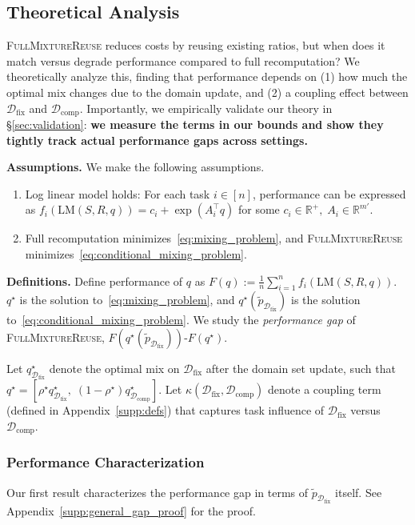 \documentclass[table]{ai2style/ai2}
\newcommand{\R}[0]{\mathbb{R}}
\newcommand{\LM}[0]{\text{LM}}
\newcommand{\Dfix}[0]{\mathcal{D}_{\text{fix}}}
\newcommand{\Dcomp}[0]{\mathcal{D}_{\text{comp}}}
\newcommand{\fullmixreuse}[0]{\textsc{FullMixtureReuse}\xspace}
\begin{document}
\subsection{Theoretical Analysis}\label{sec:analysis}

\fullmixreuse reduces costs by reusing existing ratios, but when does it match versus degrade performance compared to full recomputation? We theoretically analyze this, finding that performance depends on (1) how much the optimal mix changes due to the domain update, and (2) a coupling effect between $\Dfix$ and $\Dcomp$.
Importantly, we empirically validate our theory in \S\ref{sec:validation}: \textbf{we measure the terms in our bounds and show they tightly track actual performance gaps across settings.}

\textbf{Assumptions.} We make the following assumptions.
\begin{enumerate}[itemsep=0pt,topsep=2pt,leftmargin=12pt]
    \item Log linear model holds: For each task $i\in[n]$, performance can be expressed as $f_i(\LM(S,R,q)) = c_i + \exp(A_i^\top q)$ for some $c_i\in\R^+,\; A_i\in\R^{m'}$.
    \item Full recomputation minimizes~\eqref{eq:mixing_problem}, and \fullmixreuse minimizes~\eqref{eq:conditional_mixing_problem}. 
\end{enumerate}

\textbf{Definitions.}
Define performance of $q$ as $F(q) := \frac{1}{n}\sum_{i=1}^n f_i(\LM(S,R,q))$. $q^\star$ is the solution to~\eqref{eq:mixing_problem}, and $q^\star(\tilde p_{\Dfix})$ is the solution to~\eqref{eq:conditional_mixing_problem}. We study the \emph{performance gap} of \fullmixreuse, $F(q^\star(\tilde p_{\Dfix})) \texttt{-} F(q^\star)$.

Let $q^\star_{\Dfix}$ denote the optimal mix on $\Dfix$ after the domain set update, such that $q^\star = [\rho^\star q^\star_{\Dfix},\; (1-\rho^\star)q^\star_{\Dcomp}]$. Let $\kappa(\Dfix, \Dcomp)$ denote a coupling term (defined in Appendix~\ref{supp:defs}) that captures task influence of $\Dfix$ versus $\Dcomp$.

\subsubsection{Performance Characterization}

Our first result characterizes the performance gap in terms of $\tilde{p}_{\Dfix}$ itself. See Appendix~\ref{supp:general_gap_proof} for the proof. 
\end{document}
